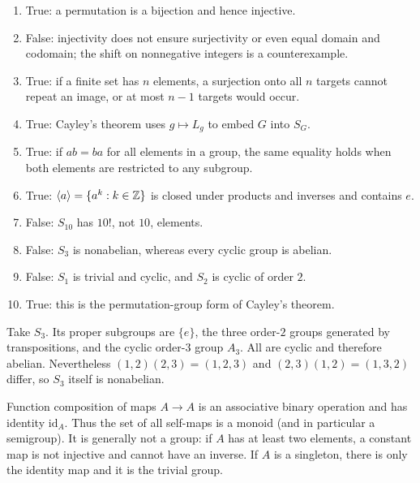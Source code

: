 \begin{enumerate}[label=(\alph*)]
\item True: a permutation is a bijection and hence injective.
\item False: injectivity does not ensure surjectivity or even equal domain and codomain; the shift on nonnegative integers is a counterexample.
\item True: if a finite set has $n$ elements, a surjection onto all $n$ targets cannot repeat an image, or at most $n-1$ targets would occur.
\item True: Cayley's theorem uses $g\mapsto L_g$ to embed $G$ into $S_G$.
\item True: if $ab=ba$ for all elements in a group, the same equality holds when both elements are restricted to any subgroup.
\item True: $\langle a\rangle=\{a^k:k\in\mathbb{Z}\}$ is closed under products and inverses and contains $e$.
\item False: $S_{10}$ has $10!$, not $10$, elements.
\item False: $S_3$ is nonabelian, whereas every cyclic group is abelian.
\item False: $S_1$ is trivial and cyclic, and $S_2$ is cyclic of order $2$.
\item True: this is the permutation-group form of Cayley's theorem.
\end{enumerate}

Take $S_3$. Its proper subgroups are $\{e\}$, the three order-$2$ groups generated by transpositions, and the cyclic order-$3$ group $A_3$. All are cyclic and therefore abelian. Nevertheless $(1,2)(2,3)=(1,2,3)$ and $(2,3)(1,2)=(1,3,2)$ differ, so $S_3$ itself is nonabelian.

Function composition of maps $A\to A$ is an associative binary operation and has identity $\mathrm{id}_A$. Thus the set of all self-maps is a monoid (and in particular a semigroup). It is generally not a group: if $A$ has at least two elements, a constant map is not injective and cannot have an inverse. If $A$ is a singleton, there is only the identity map and it is the trivial group.

